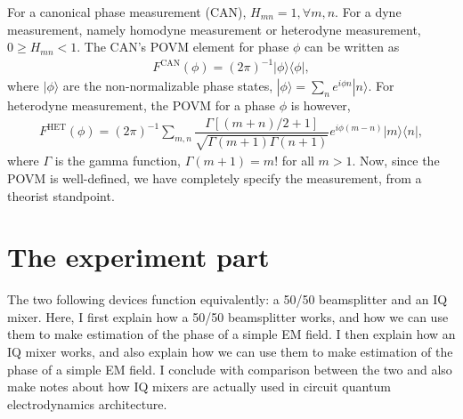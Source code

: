 \documentclass{article}
\begin{document}
For a canonical phase measurement (CAN), $H_{mn}=1, \forall m, n$. 
For a dyne measurement, namely homodyne measurement or heterodyne measurement, $0 \geq H_{mn}<1$. The CAN's POVM element for phase $\phi$ can be written as
\begin{align}
    F^{\text{CAN}}(\phi) = (2\pi)^{-1}|\phi\rangle\langle \phi|,
\end{align}
where $|\phi\rangle$ are the non-normalizable phase states, $|\phi\rangle=\sum_{n}e^{i\phi n}|n\rangle$. For heterodyne measurement, the POVM for a phase $\phi$ is however,
\begin{align}
    F^{\text{HET}}(\phi) = (2\pi)^{-1}\sum_{m,n}\dfrac{\Gamma[(m+n)/2+1]}{\sqrt{\Gamma(m+1)\Gamma(n+1)}}e^{i\phi(m-n)}|m\rangle\langle n|,
\end{align}
where $\Gamma$ is the gamma function, $\Gamma(m+1)=m!$ for all $m > 1$.  Now, since the POVM is well-defined, we have completely specify the measurement, from a theorist standpoint. 

\section{The experiment part}
The two following devices function equivalently: a 50/50 beamsplitter and an IQ mixer. Here, I first explain how a 50/50 beamsplitter works, and how we can use them to make estimation of the phase of a simple EM field. I then explain how an IQ mixer works, and also explain how we can use them to make estimation of the phase of a simple EM field. I conclude with comparison between the two and also make notes about how IQ mixers are actually used in circuit quantum electrodynamics architecture. 
\end{document}
